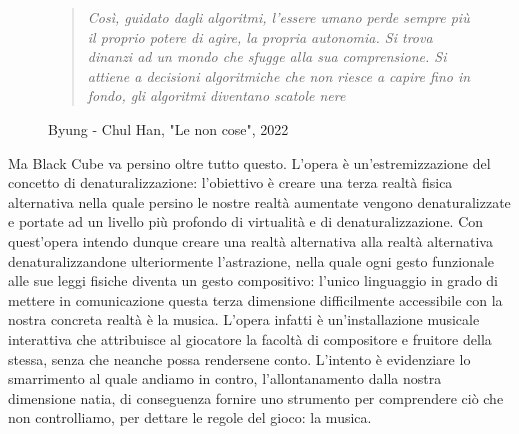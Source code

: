 	\begin{figure}
		\begin{quote}
			\textit{Così, guidato dagli algoritmi, l'essere umano perde sempre più il proprio potere di agire, la propria autonomia. Si trova dinanzi ad un mondo che sfugge alla sua comprensione. Si attiene a decisioni algoritmiche che non riesce a capire fino in fondo, gli algoritmi diventano scatole nere}
		\end{quote}
		\caption{Byung - Chul Han, "Le non cose", 2022}
	\end{figure}
	
	Ma Black Cube va persino oltre tutto questo. L'opera è un'estremizzazione del concetto di denaturalizzazione: l'obiettivo è creare una terza realtà fisica alternativa nella quale persino le nostre realtà aumentate vengono denaturalizzate e portate ad un livello più profondo di virtualità e di denaturalizzazione.
	Con quest'opera intendo dunque creare una realtà alternativa alla realtà alternativa denaturalizzandone ulteriormente l'astrazione, nella quale ogni gesto funzionale alle sue leggi fisiche diventa un gesto compositivo: l'unico linguaggio in grado di mettere in comunicazione questa terza dimensione difficilmente accessibile con la nostra concreta realtà è la musica.
	L'opera infatti è un'installazione musicale interattiva che attribuisce al giocatore la facoltà di compositore e fruitore della stessa, senza che neanche possa rendersene conto.
	L'intento è evidenziare lo smarrimento al quale andiamo in contro, l'allontanamento dalla nostra dimensione natia, di conseguenza fornire uno strumento per comprendere ciò che non controlliamo, per dettare le regole del gioco: la musica.
	
